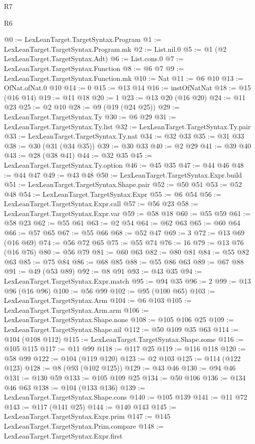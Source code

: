 \begin{lexlean}{R7}
\begin{lexlean}{R6}
\begin{coremodule}
{{{{{{{{{{{{{{{{{{{{@0 := LexLeanTarget.TargetSyntax.Program
@1 := LexLeanTarget.TargetSyntax.Program.mk
@2 := List.nil.{0}
@5 := @1 (@2 LexLeanTarget.TargetSyntax.Adt)
@6 := List.cons.{0}
@7 := LexLeanTarget.TargetSyntax.Function
@8 := @6 @7
@9 := LexLeanTarget.TargetSyntax.Function.mk
@10 := Nat
@11 := @6 @10
@13 := OfNat.ofNat.{0} @10
@14 := 0
@15 := @13 @14
@16 := instOfNatNat
@18 := @15 (@16 @14)
@19 := @11 @18
@20 := 1
@23 := @13 @20 (@16 @20)
@24 := @11 @23
@25 := @2 @10
@28 := @9 (@19 (@24 @25))
@29 := LexLeanTarget.TargetSyntax.Ty
@30 := @6 @29
@31 := LexLeanTarget.TargetSyntax.Ty.list
@32 := LexLeanTarget.TargetSyntax.Ty.pair
@33 := LexLeanTarget.TargetSyntax.Ty.nat
@34 := @32 @33
@35 := @31 @33
@38 := @30 (@31 (@34 @35))
@39 := @30 @33
@40 := @2 @29
@41 := @39 @40
@43 := @28 (@38 @41)
@44 := @32 @35
@45 := LexLeanTarget.TargetSyntax.Ty.option
@46 := @45 @35
@47 := @44 @46
@48 := @44 @47
@49 := @43 @48
@50 := LexLeanTarget.TargetSyntax.Expr.build
@51 := LexLeanTarget.TargetSyntax.Shape.pair
@52 := @50 @51
@53 := @52 @48
@54 := LexLeanTarget.TargetSyntax.Expr
@55 := @6 @54
@56 := LexLeanTarget.TargetSyntax.Expr.call
@57 := @56 @23
@58 := LexLeanTarget.TargetSyntax.Expr.var
@59 := @58 @18
@60 := @55 @59
@61 := @58 @23
@62 := @55 @61
@63 := @2 @54
@64 := @62 @63
@65 := @60 @64
@66 := @57 @65
@67 := @55 @66
@68 := @52 @47
@69 := 3
@72 := @13 @69 (@16 @69)
@74 := @56 @72 @65
@75 := @55 @74
@76 := 16
@79 := @13 @76 (@16 @76)
@80 := @56 @79
@81 := @60 @63
@82 := @80 @81
@84 := @55 @82 @63
@85 := @75 @84
@86 := @68 @85
@88 := @55 @86 @63
@89 := @67 @88
@91 := @49 (@53 @89)
@92 := @8 @91
@93 := @43 @35
@94 := LexLeanTarget.TargetSyntax.Expr.match
@95 := @94 @35
@96 := 2
@99 := @13 @96 (@16 @96)
@100 := @56 @99
@102 := @95 (@100 @65)
@103 := LexLeanTarget.TargetSyntax.Arm
@104 := @6 @103
@105 := LexLeanTarget.TargetSyntax.Arm.arm
@106 := LexLeanTarget.TargetSyntax.Shape.none
@108 := @105 @106 @25
@109 := LexLeanTarget.TargetSyntax.Shape.nil
@112 := @50 @109 @35 @63
@114 := @104 (@108 @112)
@115 := LexLeanTarget.TargetSyntax.Shape.some
@116 := @105 @115
@117 := @11 @99
@118 := @117 @25
@119 := @116 @118
@120 := @58 @99
@122 := @104 (@119 @120)
@123 := @2 @103
@125 := @114 (@122 @123)
@128 := @8 (@93 (@102 @125))
@129 := @43 @46
@130 := @94 @46
@131 := @130 @59
@133 := @105 @109 @25
@134 := @50 @106
@136 := @134 @46 @63
@138 := @104 (@133 @136)
@139 := LexLeanTarget.TargetSyntax.Shape.cons
@140 := @105 @139
@141 := @11 @72
@143 := @117 (@141 @25)
@144 := @140 @143
@145 := LexLeanTarget.TargetSyntax.Expr.prim
@147 := @145 LexLeanTarget.TargetSyntax.Prim.compare
@148 := LexLeanTarget.TargetSyntax.Expr.first
}}}}}}}}}}}}}}}}}}}}
\end{coremodule}
\end{lexlean}
\end{lexlean}
